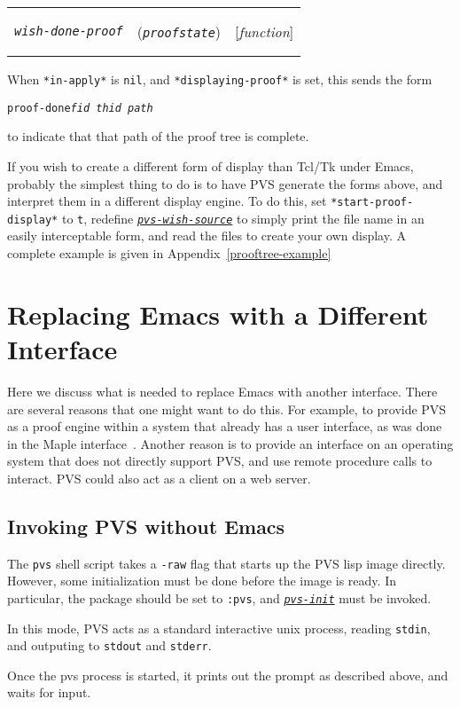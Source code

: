 \documentclass[12pt]{book}
\makeatletter
\newenvironment{function}[3]%
{\par\noindent\begin{boxedminipage}{\textwidth}%
 \par\noindent\begin{tabularx}{\linewidth}{l>{\raggedright}Xr}%
 \functionhtgt{#1}&(\texttt{\textit{#2}})&[\emph{#3}]%
 \end{tabularx}\par\flushright\begin{minipage}{.97\textwidth}}
{\end{minipage}\end{boxedminipage}}
\newcommand{\functionarg}[1]{\texttt{\textit{#1}}}
\newcommand{\functionnm}[1]{\texttt{\textit{#1}}}
\newcommand{\functionhln}[1]{\hyperlink{#1}{\functionnm{#1}}}
\newcommand{\functionhtgt}[1]{\hypertarget{#1}{\functionnm{#1}}\index{#1@\functionnm{#1}|underline}}
\newenvironment{lispfunction}[2]%
{\begin{function}{#1}{#2}{function}}{\end{function}}
\newcommand{\globalnm}[1]{\texttt{\textup{#1}}}
\makeatother
\begin{document}
\begin{lispfunction}{wish-done-proof}{proofstate}
When \globalnm{*in-apply*} is \texttt{nil}, and
\globalnm{*displaying-proof*} is set, this sends the form
\begin{alltt}
  proof-done \functionarg{fid thid path}
\end{alltt}
to indicate that that path of the proof tree is complete.
\end{lispfunction}

If you wish to create a different form of display than Tcl/Tk under Emacs,
probably the simplest thing to do is to have PVS generate the forms above,
and interpret them in a different display engine.  To do this, set
\globalnm{*start-proof-display*} to \texttt{t}, redefine
\functionhln{pvs-wish-source} to simply print the file name in an easily
interceptable form, and read the files to create your own display.
A complete example is given in Appendix~\ref{prooftree-example}


\section{Replacing Emacs with a Different Interface}

Here we discuss what is needed to replace Emacs with another interface.
There are several reasons that one might want to do this.  For example, to
provide PVS as a proof engine within a system that already has a user
interface, as was done in the Maple interface~\cite{maple}.  Another
reason is to provide an interface on an operating system that does not
directly support PVS, and use remote procedure calls to interact.  PVS
could also act as a client on a web server.

\subsection{Invoking PVS without Emacs}

The \texttt{pvs} shell script takes a \texttt{-raw} flag that starts up
the PVS lisp image directly.  However, some initialization must be done
before the image is ready.  In particular, the package should be set to
\texttt{:pvs}, and  \functionhln{pvs-init} must be invoked.

In this mode, PVS acts as a standard interactive unix process, reading
\texttt{stdin}, and outputing to \texttt{stdout} and \texttt{stderr}.

Once the pvs process is started, it prints out the prompt as described
above, and waits for input.
\end{document}
